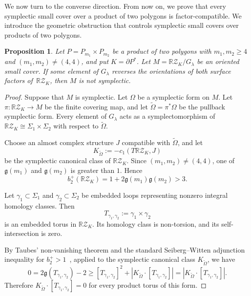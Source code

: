 \documentclass{amsart}
\newtheorem{proposition}[theorem]{Proposition}
\numberwithin{equation}{section}
\theoremstyle{definition}
\theoremstyle{remark}
\newcommand{\RZ}{\mathbb R\mathcal Z}
\def\genus{\mathfrak g}
\begin{document}
We now turn to the converse direction.
From now on, we prove that every symplectic small cover over a product of two polygons is factor-compatible.
We introduce the geometric obstruction that controls symplectic small covers over products of two polygons.
\begin{proposition}\label{prop-product-factor-reversal}
    Let $P=P_{m_1}\times P_{m_2}$ be a product of two polygons with $m_1,m_2\geq 4$ and $(m_1,m_2)\ne (4,4)$, and put $K=\partial P^\ast$.
    Let $M=\RZ_K/G_\lambda$ be an oriented small cover.
    If some element of $G_\lambda$ reverses the orientations of both surface factors of~$\RZ_K$, then $M$ is not symplectic.
\end{proposition}
\begin{proof}
    Suppose that $M$ is symplectic.
    Let $\Omega$ be a symplectic form on $M$.
    Let $\pi \colon \RZ_K\to M$ be the finite covering map, and let $\widetilde\Omega=\pi^\ast\Omega$ be the pullback symplectic form.
    Every element of $G_\lambda$ acts as a symplectomorphism of $\RZ_K\cong \Sigma_1\times \Sigma_2$ with respect to $\widetilde\Omega$.
    
    Choose an almost complex structure $J$ compatible with $\widetilde\Omega$, and let
    $$
    K_{\widetilde\Omega}:=-c_1(T\RZ_K,J)
    $$
    be the symplectic canonical class of $\RZ_K$.
    Since $(m_1,m_2)\neq (4,4)$, one of $\genus(m_1)$ and $\genus(m_2)$ is greater than $1$.
    Hence 
    \begin{equation} \label{eq:b2+}
        b_2^+(\RZ_K)=1+2\genus(m_1)\genus(m_2)>3.      
    \end{equation}

    Let $\gamma_1\subset \Sigma_1$ and $\gamma_2\subset \Sigma_2$ be embedded loops representing nonzero integral homology classes.
    Then
    $$
        T_{\gamma_1,\gamma_2}:=\gamma_1\times\gamma_2
    $$
    is an embedded torus in $\RZ_K$.
    Its homology class is non-torsion, and its self-intersection is zero.

    By Taubes' non-vanishing theorem and the standard Seiberg--Witten adjunction inequality for $b_2^+>1$~\cite{Taubes1994, Ozsvath-Szabo2000}, applied to the symplectic canonical class $K_{\widetilde\Omega}$, we have
    $$
        0=2\genus(T_{\gamma_1,\gamma_2})-2 \ge [T_{\gamma_1,\gamma_2}]^2+\left|K_{\widetilde\Omega}\cdot [T_{\gamma_1,\gamma_2}]\right|= \left|K_{\widetilde\Omega}\cdot [T_{\gamma_1,\gamma_2}]\right|.
    $$
    Therefore $K_{\widetilde\Omega}\cdot [T_{\gamma_1,\gamma_2}]=0$ for every product torus of this form.


\end{proof}
\end{document}
